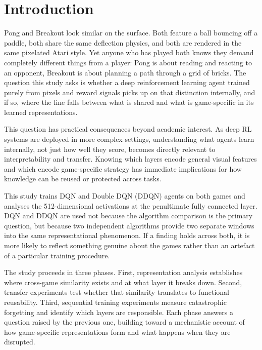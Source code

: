 \documentclass[a4paper]{article}
\begin{document}
\tableofcontents
\newpage

\section{Introduction}

Pong and Breakout look similar on the surface. Both feature a ball bouncing off a paddle, both share the same deflection physics, and both are rendered in the same pixelated Atari style. Yet anyone who has played both knows they demand completely different things from a player: Pong is about reading and reacting to an opponent, Breakout is about planning a path through a grid of bricks. The question this study asks is whether a deep reinforcement learning agent trained purely from pixels and reward signals picks up on that distinction internally, and if so, where the line falls between what is shared and what is game-specific in its learned representations.

This question has practical consequences beyond academic interest. As deep RL systems are deployed in more complex settings, understanding what agents learn internally, not just how well they score, becomes directly relevant to interpretability and transfer. Knowing which layers encode general visual features and which encode game-specific strategy has immediate implications for how knowledge can be reused or protected across tasks.

This study trains DQN \cite{mnih2015human} and Double DQN (DDQN) \cite{van2016deep} agents on both games and analyses the 512-dimensional activations at the penultimate fully connected layer. DQN and DDQN are used not because the algorithm comparison is the primary question, but because two independent algorithms provide two separate windows into the same representational phenomenon. If a finding holds across both, it is more likely to reflect something genuine about the games rather than an artefact of a particular training procedure.

The study proceeds in three phases. First, representation analysis establishes where cross-game similarity exists and at what layer it breaks down. Second, transfer experiments test whether that similarity translates to functional reusability. Third, sequential training experiments measure catastrophic forgetting and identify which layers are responsible. Each phase answers a question raised by the previous one, building toward a mechanistic account of how game-specific representations form and what happens when they are disrupted.
\end{document}
